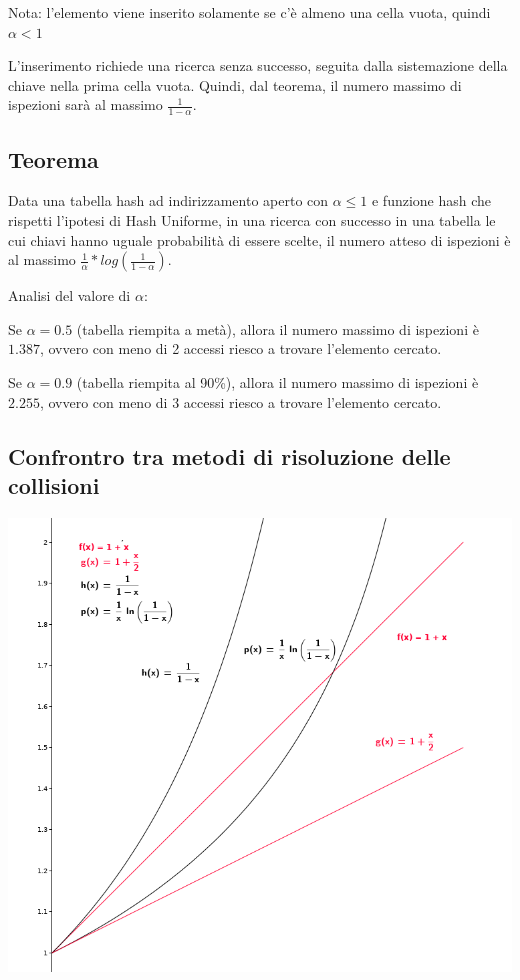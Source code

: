 \documentclass[11pt,a4paper,twoside,openright]{book}
\begin{document}
{Nota: l'elemento viene inserito solamente se c'è almeno una cella vuota, quindi $\alpha < 1$}

{L'inserimento richiede una ricerca senza successo, seguita dalla sistemazione della chiave nella prima cella vuota. Quindi, dal teorema, il numero massimo di ispezioni sarà al massimo $\frac{1}{1-\alpha}$.}

\subsection{Teorema}

{Data una tabella hash ad indirizzamento aperto con $\alpha \leq 1$ e funzione hash che rispetti l'ipotesi di Hash Uniforme, in una ricerca con successo in una tabella le cui chiavi hanno uguale probabilità di essere scelte, il numero atteso di ispezioni è al massimo $\frac{1}{\alpha} * log(\frac{1}{1-\alpha})$.}

{Analisi del valore di $\alpha$:}

{Se $\alpha=0.5$ (tabella riempita a metà), allora il numero massimo di ispezioni è $1.387$, ovvero con meno di 2 accessi riesco a trovare l'elemento cercato.}

{Se $\alpha=0.9$ (tabella riempita al 90\%), allora il numero massimo di ispezioni è $2.255$, ovvero con meno di 3 accessi riesco a trovare l'elemento cercato.}

\subsection{Confrontro tra metodi di risoluzione delle collisioni}

{\includegraphics{images/image541.png}}
\end{document}

